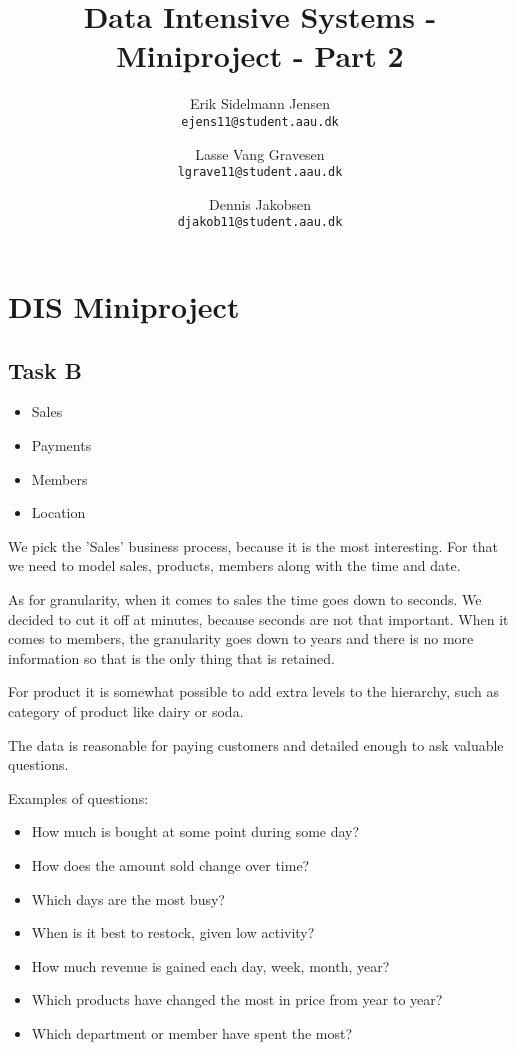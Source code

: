 

\author{
  Erik Sidelmann Jensen\\
  \texttt{ejens11@student.aau.dk}
  \and
  Lasse Vang Gravesen\\
  \texttt{lgrave11@student.aau.dk}
  \and
  Dennis Jakobsen\\
  \texttt{djakob11@student.aau.dk}  
}

\title{Data Intensive Systems - Miniproject - Part 2}
\date{}


	\clearpage\maketitle
	\thispagestyle{empty}
	
	\chapter{DIS Miniproject}
	\section{Task B}
	\begin{itemize}
	\item Sales
	\item Payments
	\item Members
	\item Location
	\end{itemize}
	
	We pick the 'Sales' business process, because it is the most interesting. For that we need to model sales, products, members along with the time and date.
	
	As for granularity, when it comes to sales the time goes down to seconds. We decided to cut it off at minutes, because seconds are not that important. When it comes to members, the granularity goes down to years and there is no more information so that is the only thing that is retained. 
	
	For product it is somewhat possible to add extra levels to the hierarchy, such as category of product like dairy or soda.
	
	The data is reasonable for paying customers and detailed enough to ask valuable questions.
	
	Examples of questions:
	\begin{itemize}
	\item How much is bought at some point during some day?
	\item How does the amount sold change over time?
	\item Which days are the most busy?
	\item When is it best to restock, given low activity?
	\item How much revenue is gained each day, week, month, year?
	\item Which products have changed the most in price from year to year?
	\item Which department or member have spent the most?
	\end{itemize}


